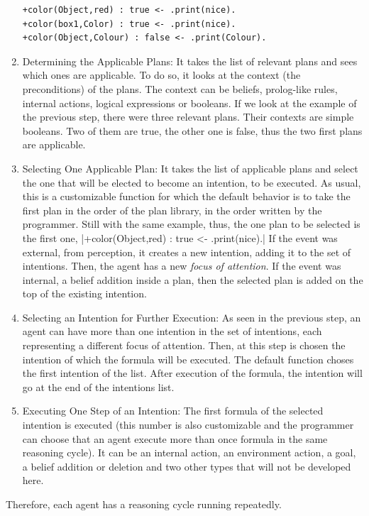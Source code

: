 \documentclass[a4paper,11pt,twoside]{StyleThese}
\begin{document}
\begin{enumerate}
\begin{lstlisting}[style=inline]
+color(Object,red) : true <- .print(nice).
+color(box1,Color) : true <- .print(nice).
+color(Object,Colour) : false <- .print(Colour).
\end{lstlisting}
	\item Determining the Applicable Plans: It takes the list of relevant plans and sees which ones are applicable. To do so, it looks at the context (the preconditions) of the plans. The context can be beliefs, prolog-like rules, internal actions, logical expressions or booleans. If we look at the example of the previous step, there were three relevant plans. Their contexts are simple booleans. Two of them are true, the other one is false, thus the two first plans are applicable.
	\item Selecting One Applicable Plan: It takes the list of applicable plans and select the one that will be elected to become an intention, \ie to be executed. As usual, this is a customizable function for which the default behavior is to take the first plan in the order of the plan library, \ie in the order written by the programmer. Still with the same example, thus, the one plan to be selected is the first one, |+color(Object,red) : true <- .print(nice).| If the event was external, \ie from perception, it creates a new intention, adding it to the set of intentions. Then, the agent has a new \textit{focus of attention}. If the event was internal, \eg a belief addition inside a plan, then the selected plan is added on the top of the existing intention. 
	\item Selecting an Intention for Further Execution: As seen in the previous step, an agent can have more than one intention in the set of intentions, each representing a different focus of attention. Then, at this step is chosen the intention of which the formula will be executed. The default function choses the first intention of the list. After execution of the formula, the intention will go at the end of the intentions list.
	\item Executing One Step of an Intention: The first formula of the selected intention is executed (this number is also customizable and the programmer can choose that an agent execute more than once formula in the same reasoning cycle). It can be an internal action, an environment action, a goal, a belief addition or deletion and two other types that will not be developed here. 
\end{enumerate}

Therefore, each agent has a reasoning cycle running repeatedly.
\end{document}
